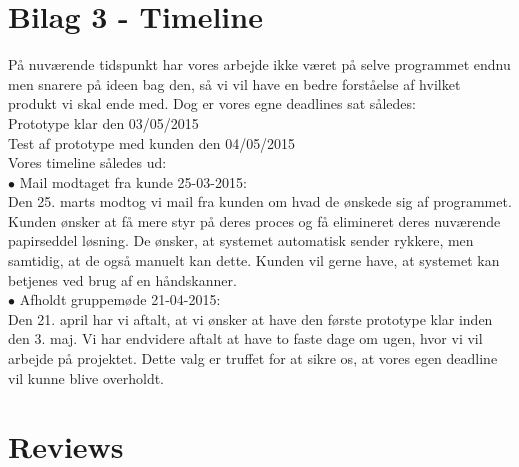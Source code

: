 \documentclass[a4paper]{article}
\begin{document}
\section{Bilag 3 - Timeline}
På nuværende tidspunkt har vores arbejde ikke været på selve programmet endnu men snarere på ideen bag den, så vi vil have en bedre forståelse af hvilket produkt vi skal ende med. Dog er vores egne deadlines sat således:\\
Prototype klar den 03/05/2015 \\
Test af prototype med kunden den 04/05/2015\\
Vores timeline således ud:\\
$\bullet$ Mail modtaget fra kunde 25-03-2015:\\
Den 25. marts modtog vi mail fra kunden om hvad de ønskede sig af programmet. Kunden ønsker at få mere styr på deres proces og få elimineret deres nuværende papirseddel løsning. De ønsker, at systemet automatisk sender rykkere, men samtidig, at de også manuelt kan dette. Kunden vil gerne have, at systemet kan betjenes ved brug af en håndskanner.\\
$\bullet$ Afholdt gruppemøde 21-04-2015:\\
Den 21. april har vi aftalt, at vi ønsker at have den første prototype klar inden den 3. maj. Vi har endvidere aftalt at have to faste dage om ugen, hvor vi vil arbejde på projektet. Dette valg er truffet for at sikre os, at vores egen deadline vil kunne blive overholdt.
\pagebreak
\section{Reviews}
\end{document}
